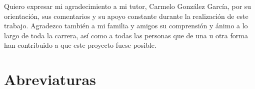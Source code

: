\documentclass[11pt,a4paper,oneside]{report}
\begin{document}
Quiero expresar mi agradecimiento a mi tutor, Carmelo González García, por su orientación, sus comentarios y su apoyo constante durante la realización de este trabajo. Agradezco también a mi familia y amigos su comprensión y ánimo a lo largo de toda la carrera, así como a todas las personas que de una u otra forma han contribuido a que este proyecto fuese posible.

\clearpage
\tableofcontents
\clearpage
\listoffigures
\clearpage
\listoftables
\clearpage

\chapter*{Abreviaturas}

\begin{description}[style=nextline,leftmargin=3.3cm]


\end{description}
\end{document}
